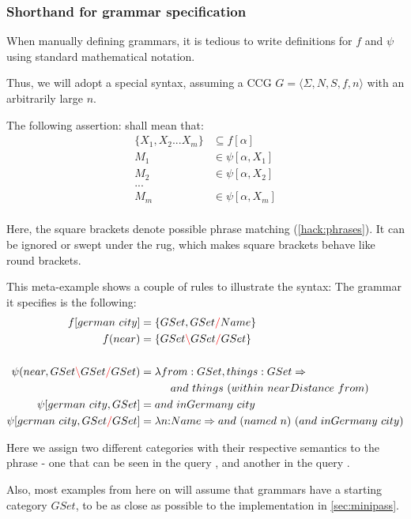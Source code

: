 \documentclass[main.tex]{subfiles}
\begin{document}
\subsubsection{Shorthand for grammar specification}
\label{shorthand}
When manually defining grammars, it is tedious to write definitions
for $f$ and $\psi$ using standard mathematical notation.

Thus, we will adopt a special syntax, assuming a CCG
$G = \langle \Sigma, N, S, f, n \rangle$ with an arbitrarily large $n$.

The following assertion:
shall mean that:
\begin{align*}
    \{ X_1, X_2 ... X_m \} & \subseteq f[\alpha] \\
    M_1 & \in \psi[\alpha, X_1] \\
    M_2 & \in \psi[\alpha, X_2] \\
    ... & \\
    M_m & \in \psi[\alpha, X_m] \\
\end{align*}

Here, the square brackets denote possible phrase matching (\cref{hack:phrases}). It can
be ignored or swept under the rug, which makes square brackets behave like
round brackets.

\begin{example}
    This meta-example shows a couple of rules to illustrate the syntax:
    The grammar it specifies is the following:
    \begin{align*}
        f[german \text{ } city] &= \{ GSet, GSet \textcolor{red}{/} Name \} \\
        f(near) &= \{ GSet \textcolor{red}{\backslash} GSet \textcolor{red}{/} GSet \} \\
        \\
        \psi(near, GSet \textcolor{red}{\backslash} GSet \textcolor{red}{/} GSet) &= \lambda from: GSet, things: GSet \Rightarrow \\
        & \phantom{=} \qquad and \text{ } things \text{ } (within \text{ } nearDistance \text{ } from) \\
        \psi[german \text{ } city, GSet] &= and \text{ } inGermany \text{ } city \\
        \psi[german \text{ } city, GSet \textcolor{red}{/} GSet] &= \lambda n{:} Name \Rightarrow and \text{ } (named \text{ } n) \text{ } (and \text{ } inGermany \text{ } city) \\
     \end{align*}

     Here we assign two different categories with their respective semantics
     to the phrase  - one that can be seen in the query
     , and another in the query
     .
 \end{example}

Also, most examples from here on will assume that grammars have a starting
category $GSet$, to be as close as possible to the implementation in
\cref{sec:minipass}.
\end{document}
